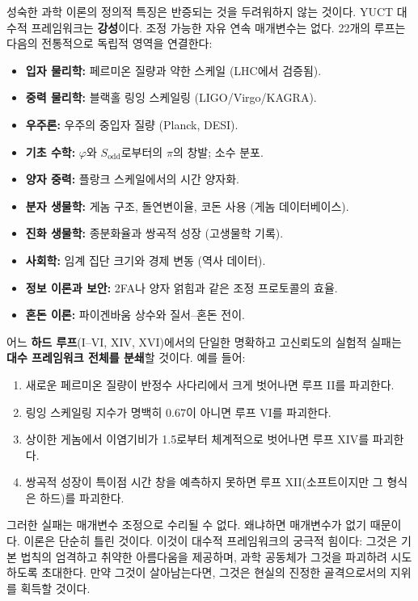 \documentclass[12pt,a4paper]{article}
\begin{document}
	성숙한 과학 이론의 정의적 특징은 반증되는 것을 두려워하지 않는 것이다. YUCT 대수적 프레임워크는 \textbf{강성}이다. 조정 가능한 자유 연속 매개변수는 없다. 22개의 루프는 다음의 전통적으로 독립적 영역을 연결한다:
	\begin{itemize}
		\item \textbf{입자 물리학:} 페르미온 질량과 약한 스케일 (LHC에서 검증됨).
		\item \textbf{중력 물리학:} 블랙홀 링잉 스케일링 (LIGO/Virgo/KAGRA).
		\item \textbf{우주론:} 우주의 중입자 질량 (Planck, DESI).
		\item \textbf{기초 수학:} \(\varphi\)와 \(S_{\mathrm{odd}}\)로부터의 \(\pi\)의 창발; 소수 분포.
		\item \textbf{양자 중력:} 플랑크 스케일에서의 시간 양자화.
		\item \textbf{분자 생물학:} 게놈 구조, 돌연변이율, 코돈 사용 (게놈 데이터베이스).
		\item \textbf{진화 생물학:} 종분화율과 쌍곡적 성장 (고생물학 기록).
		\item \textbf{사회학:} 임계 집단 크기와 경제 변동 (역사 데이터).
		\item \textbf{정보 이론과 보안:} 2FA나 양자 얽힘과 같은 조정 프로토콜의 효율.
		\item \textbf{혼돈 이론:} 파이겐바움 상수와 질서–혼돈 전이.
	\end{itemize}
	어느 \textbf{하드 루프}(I–VI, XIV, XVI)에서의 단일한 명확하고 고신뢰도의 실험적 실패는 \textbf{대수 프레임워크 전체를 분쇄}할 것이다. 예를 들어:
	\begin{enumerate}
		\item 새로운 페르미온 질량이 반정수 사다리에서 크게 벗어나면 루프 II를 파괴한다.
		\item 링잉 스케일링 지수가 명백히 \(0.67\)이 아니면 루프 VI를 파괴한다.
		\item 상이한 게놈에서 이염기비가 1.5로부터 체계적으로 벗어나면 루프 XIV를 파괴한다.
		\item 쌍곡적 성장이 특이점 시간 창을 예측하지 못하면 루프 XII(소프트이지만 그 형식은 하드)를 파괴한다.
	\end{enumerate}
	그러한 실패는 매개변수 조정으로 수리될 수 없다. 왜냐하면 매개변수가 없기 때문이다. 이론은 단순히 틀린 것이다. 이것이 대수적 프레임워크의 궁극적 힘이다: 그것은 기본 법칙의 엄격하고 취약한 아름다움을 제공하며, 과학 공동체가 그것을 파괴하려 시도하도록 초대한다. 만약 그것이 살아남는다면, 그것은 현실의 진정한 골격으로서의 지위를 획득할 것이다.
	
\end{document}
